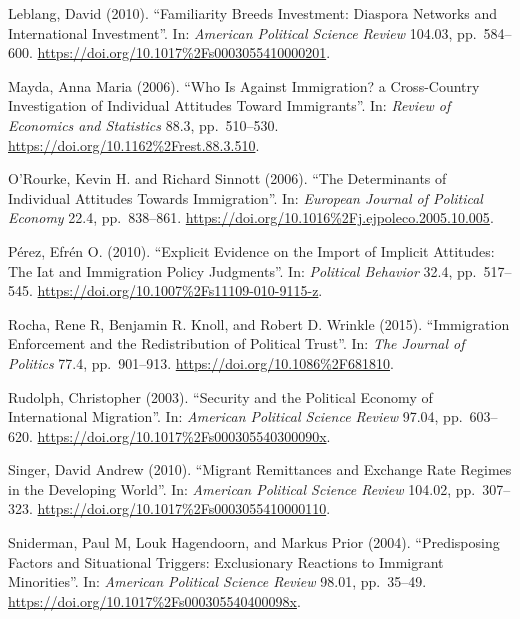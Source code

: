 \documentclass[10pt,]{article}
\begin{document}
Leblang, David (2010). ``Familiarity Breeds Investment: Diaspora
Networks and International Investment''. In:
\emph{American Political Science Review} 104.03, pp.~584--600.
\url{https://doi.org/10.1017\%2Fs0003055410000201}.

Mayda, Anna Maria (2006). ``Who Is Against Immigration? a Cross-Country
Investigation of Individual Attitudes Toward Immigrants''. In:
\emph{Review of Economics and Statistics} 88.3, pp.~510--530.
\url{https://doi.org/10.1162\%2Frest.88.3.510}.

O'Rourke, Kevin H. and Richard Sinnott (2006). ``The Determinants of
Individual Attitudes Towards Immigration''. In:
\emph{European Journal of Political Economy} 22.4, pp.~838--861.
\url{https://doi.org/10.1016\%2Fj.ejpoleco.2005.10.005}.

Pérez, Efrén O. (2010). ``Explicit Evidence on the Import of Implicit
Attitudes: The Iat and Immigration Policy Judgments''. In:
\emph{Political Behavior} 32.4, pp.~517--545.
\url{https://doi.org/10.1007\%2Fs11109-010-9115-z}.

Rocha, Rene R, Benjamin R. Knoll, and Robert D. Wrinkle (2015).
``Immigration Enforcement and the Redistribution of Political Trust''.
In: \emph{The Journal of Politics} 77.4, pp.~901--913.
\url{https://doi.org/10.1086\%2F681810}.

Rudolph, Christopher (2003). ``Security and the Political Economy of
International Migration''. In: \emph{American Political Science Review}
97.04, pp.~603--620. \url{https://doi.org/10.1017\%2Fs000305540300090x}.

Singer, David Andrew (2010). ``Migrant Remittances and Exchange Rate
Regimes in the Developing World''. In:
\emph{American Political Science Review} 104.02, pp.~307--323.
\url{https://doi.org/10.1017\%2Fs0003055410000110}.

Sniderman, Paul M, Louk Hagendoorn, and Markus Prior (2004).
``Predisposing Factors and Situational Triggers: Exclusionary Reactions
to Immigrant Minorities''. In: \emph{American Political Science Review}
98.01, pp.~35--49. \url{https://doi.org/10.1017\%2Fs000305540400098x}.
\end{document}
